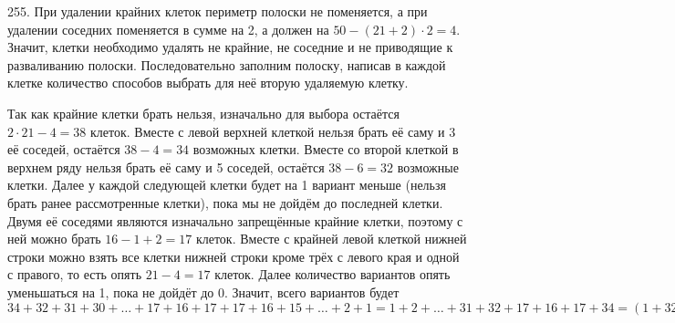 255. При удалении крайних клеток периметр полоски не поменяется, а при удалении соседних поменяется в сумме на 2, а должен на $50-(21+2)\cdot2=4.$ Значит, клетки необходимо удалять не крайние, не соседние и не приводящие к разваливанию полоски. Последовательно заполним полоску, написав в каждой клетке количество способов выбрать для неё вторую удаляемую клетку.
\begin{center}
\begin{figure}[ht!]
\end{figure}
\end{center}
Так как крайние клетки брать нельзя, изначально для выбора остаётся $2\cdot21-4=38$ клеток. Вместе с левой верхней клеткой нельзя брать её саму и 3 её соседей, остаётся $38-4=34$ возможных клетки. Вместе со второй клеткой в верхнем ряду нельзя брать её саму и 5 соседей, остаётся $38-6=32$ возможные клетки. Далее у каждой следующей клетки будет на 1 вариант меньше (нельзя брать ранее рассмотренные клетки), пока мы не дойдём до последней клетки. Двумя её соседями являются изначально запрещённые крайние клетки, поэтому с ней можно брать $16-1+2=17$ клеток. Вместе с крайней левой клеткой нижней строки можно взять все клетки нижней строки кроме трёх с левого края и одной с правого, то есть опять $21-4=17$ клеток. Далее количество вариантов опять уменьшаться на 1, пока не дойдёт до 0. Значит, всего вариантов будет $34+32+31+30+\ldots+17+16+17+17+16+15+\ldots+2+1=1+2+\ldots+31+32+17+16+17+34=(1+32)+(2+21)+\ldots+(16+17)+84=33\cdot16+84=612.$\\
